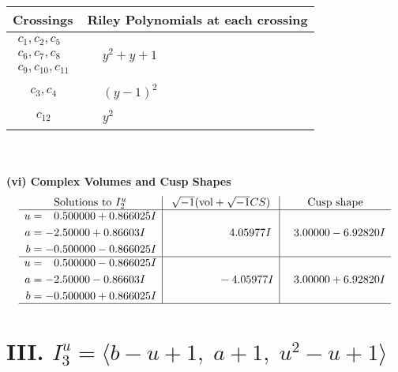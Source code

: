 \documentclass[1p]{elsarticle_modified}
\theoremstyle{definition}
\newcommand{\I}{\sqrt{-1}}
\begin{document}
\begin{tabular}{m{50pt}|m{274pt}}
Crossings & \hspace{64pt}Riley Polynomials at each crossing \\
\hline $$\begin{aligned}c_{1},c_{2},c_{5}\\c_{6},c_{7},c_{8}\\c_{9},c_{10},c_{11}\end{aligned}$$&$\begin{aligned}
&y^2+y+1
\end{aligned}$\\
\hline $$\begin{aligned}c_{3},c_{4}\end{aligned}$$&$\begin{aligned}
&(y-1)^2
\end{aligned}$\\
\hline $$\begin{aligned}c_{12}\end{aligned}$$&$\begin{aligned}
&y^2
\end{aligned}$\\
\hline
\end{tabular}\\~\\
\newpage\flushleft \textbf{(vi) Complex Volumes and Cusp Shapes}
$$\begin{array}{c|c|c}  
\text{Solutions to }I^u_{2}& \I (\text{vol} + \sqrt{-1}CS) & \text{Cusp shape}\\
 \hline 
\begin{aligned}
u &= \phantom{-}0.500000 + 0.866025 I \\
a &= -2.50000 + 0.86603 I \\
b &= -0.500000 - 0.866025 I\end{aligned}
 & \phantom{-0.000000 -}4.05977 I & \phantom{-}3.00000 - 6.92820 I \\ \hline\begin{aligned}
u &= \phantom{-}0.500000 - 0.866025 I \\
a &= -2.50000 - 0.86603 I \\
b &= -0.500000 + 0.866025 I\end{aligned}
 & \phantom{-0.000000 } -4.05977 I & \phantom{-}3.00000 + 6.92820 I\\
 \hline 
 \end{array}$$\newpage\newpage\renewcommand{\arraystretch}{1}
\centering \section*{III. $I^u_{3}= \langle b- u+1,\;a+1,\;u^2- u+1 \rangle$}
\end{document}
